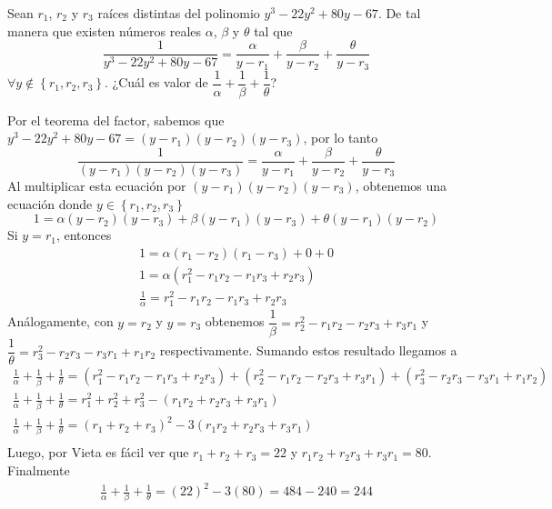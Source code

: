 \begin{section-problem}
    Sean $r_1$, $r_2$ y $r_3$ raíces distintas del polinomio $y^3 - 22 y^2 + 80 y - 67$.
    De tal manera que existen números reales $\alpha$, $\beta$ y $\theta$ tal que
    \[\frac{1}{y^3 - 22 y^2 + 80 y - 67} = \frac{\alpha}{y - r_1} + \frac{\beta}{y - r_2} + \frac{\theta}{y - r_3}\]
    $\forall y \notin \left\{ r_1, r_2, r_3 \right\}$.
    ¿Cuál es valor de $\dfrac{1}{\alpha} + \dfrac{1}{\beta} + \dfrac{1}{\theta}$?

    \begin{solution}
        Por el teorema del factor, sabemos que $y^3 - 22 y^2 + 80 y - 67 = (y - r_1)(y - r_2)(y - r_3)$, por lo tanto
        \[\frac{1}{(y - r_1)(y - r_2)(y - r_3)} = \frac{\alpha}{y - r_1} + \frac{\beta}{y - r_2} + \frac{\theta}{y - r_3}\]
        Al multiplicar esta ecuación por $(y - r_1)(y - r_2)(y - r_3)$, obtenemos una ecuación donde $y \in \left\{ r_1, r_2, r_3 \right\}$
        \[1 = \alpha(y - r_2)(y - r_3) + \beta(y - r_1)(y - r_3) + \theta(y - r_1)(y - r_2)\]
        Si $y = r_1$, entonces
        \begin{gather*}
            1 = \alpha(r_1 - r_2)(r_1 - r_3) + 0 + 0\\
            1 = \alpha(r_1^2 - r_1 r_2 - r_1 r_3 + r_2 r_3)\\
            \frac{1}{\alpha} = r_1^2 - r_1 r_2 - r_1 r_3 + r_2 r_3
        \end{gather*}
        Análogamente, con $y = r_2$ y $y = r_3$ obtenemos $\dfrac{1}{\beta} = r_2^2 - r_1 r_2 - r_2 r_3 + r_3 r_1$ y $\dfrac{1}{\theta} = r_3^2 - r_2 r_3 - r_3 r_1 + r_1 r_2$ respectivamente.
        Sumando estos resultado llegamos a
        \begin{gather*}
            \frac{1}{\alpha} + \frac{1}{\beta} + \frac{1}{\theta} = (r_1^2 - r_1 r_2 - r_1 r_3 + r_2 r_3) + (r_2^2 - r_1 r_2 - r_2 r_3 + r_3 r_1) + (r_3^2 - r_2 r_3 - r_3 r_1 + r_1 r_2)\\
            \frac{1}{\alpha} + \frac{1}{\beta} + \frac{1}{\theta} = r_1^2 + r_2^2 + r_3^2 - (r_1 r_2 + r_2 r_3 + r_3 r_1)\\
            \frac{1}{\alpha} + \frac{1}{\beta} + \frac{1}{\theta} = (r_1 + r_2 + r_3)^2 - 3(r_1 r_2 + r_2 r_3 + r_3 r_1)\\
        \end{gather*}
        Luego, por Vieta es fácil ver que $r_1 + r_2 + r_3 = 22$ y $r_1 r_2 + r_2 r_3 + r_3 r_1 = 80$.
        Finalmente
        \begin{gather*}
            \frac{1}{\alpha} + \frac{1}{\beta} + \frac{1}{\theta} = (22)^2 - 3(80) = 484 - 240 = \boxed{244}
        \end{gather*}
    \end{solution}
\end{section-problem}

